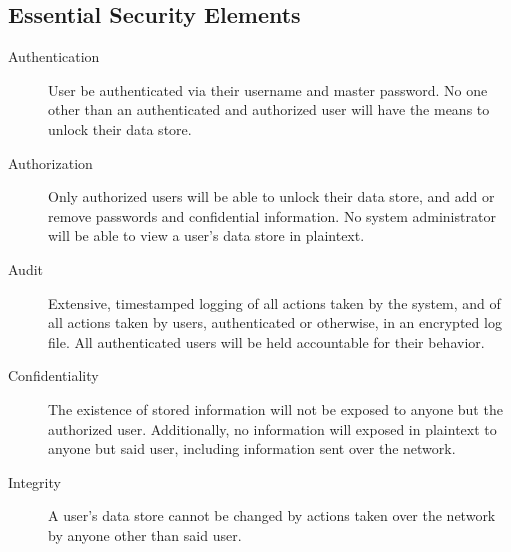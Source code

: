 \documentclass{article}
\begin{document}
\subsection{Essential Security Elements}
\label{sub:essential_security_elements}

\begin{description}
  \item[Authentication] User be authenticated via their username and master password. No one other than an authenticated and authorized user will have the means to unlock their data store.
  \item[Authorization] Only authorized users will be able to unlock their data store, and add or remove passwords and confidential information. No system administrator will be able to view a user's data store in plaintext.
  \item[Audit] Extensive, timestamped logging of all actions taken by the system, and of all actions taken by users, authenticated or otherwise, in an encrypted log file. All authenticated users will be held accountable for their behavior.
  \item[Confidentiality] The existence of stored information will not be exposed to anyone but the authorized user. Additionally, no information will exposed in plaintext to anyone but said user, including information sent over the network.
  \item[Integrity] A user's data store cannot be changed by actions taken over the network by anyone other than said user.
\end{description}
\end{document}
